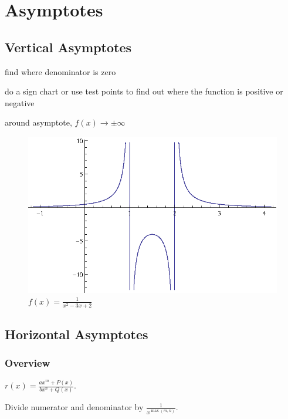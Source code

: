\documentclass{exam}
\begin{document}
  \pagebreak

  \section{Asymptotes}

  \subsection{Vertical Asymptotes}
  \begin{itemize*}
    \item find where denominator is zero
    \item do a sign chart or use test points to find out where the function is positive or negative
    \item around asymptote, $f(x) \rightarrow \pm \infty$
  \end{itemize*}

  \begin{figure}[H]
    \centering
    \includegraphics[scale=1.0]{figure2.eps}
    \caption*{$f(x) = \frac{1}{x^2-3 x+2}$}
  \end{figure}

  \subsection{Horizontal Asymptotes}

  \subsubsection{Overview}
  $r(x) = \frac{ax^m + P(x)}{bx^n + Q(x)}$.  

  Divide numerator and denominator by $\frac{1}{x^{\max(m, n)}}$.
\end{document}
